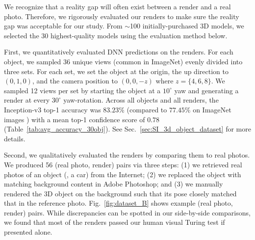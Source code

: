 \documentclass[10pt,twocolumn,letterpaper]{article}
\newcommand{\subsec}[1]{\noindent{\textbf{#1.}}}
\begin{document}
\subsec{Evaluation}
We recognize that a reality gap will often exist between a render and a real photo.
Therefore, we rigorously evaluated our renders to make sure the reality gap was acceptable for our study.
From $\sim$100 initially-purchased 3D models, we selected the 30 highest-quality models using the evaluation method below.

First, we quantitatively evaluated DNN predictions on the renders.
For each object, we sampled 36 unique views (common in ImageNet) evenly divided into three sets.
For each set, we set the object at the origin, the up direction to $(0,1,0)$, and the camera position to $(0,0,-z)$ where $z = \{4, 6, 8\}$.
We sampled 12 views per set by starting the object at a $10^\circ{}$ yaw and generating a render at every $30^\circ{}$ yaw-rotation.
Across all objects and all renders, the Inception-v3 top-1 accuracy was $83.23\%$ (compared to $77.45\%$ on ImageNet images \cite{szegedy2016rethinking}) with a mean top-1 confidence score of $0.78$ (Table~\ref{tab:avg_accuracy_30obj}).
See Sec.~\ref{sec:SI_3d_object_dataset} for more details.

Second, we qualitatively evaluated the renders by comparing them to real photos.
We produced 56 (real photo, render) pairs via three steps: (1) we retrieved real photos of an object (\eg, a car) from the Internet; (2) we replaced the object with matching background content in Adobe Photoshop; and (3) we manually rendered the 3D object on the background such that its pose closely matched that in the reference photo.
Fig.~\ref{fig:dataset_B} shows example (real photo, render) pairs.
While discrepancies can be spotted in our side-by-side comparisons, we found that most of the renders passed our human visual Turing test if presented alone.

%
\end{document}
